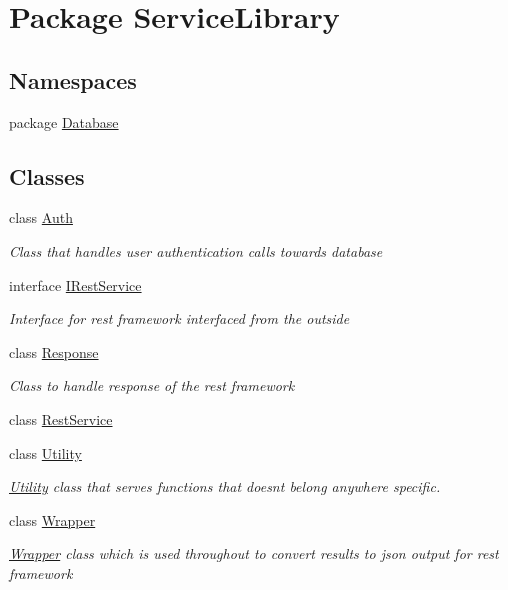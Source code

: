 \hypertarget{namespace_service_library}{\section{Package Service\-Library}
\label{namespace_service_library}
}
\subsection*{Namespaces}
\begin{DoxyCompactItemize}
\item 
package \hyperlink{namespace_service_library_1_1_database}{Database}
\end{DoxyCompactItemize}
\subsection*{Classes}
\begin{DoxyCompactItemize}
\item 
class \hyperlink{class_service_library_1_1_auth}{Auth}
\begin{DoxyCompactList}\small\item\em Class that handles user authentication calls towards database \end{DoxyCompactList}\item 
interface \hyperlink{interface_service_library_1_1_i_rest_service}{I\-Rest\-Service}
\begin{DoxyCompactList}\small\item\em Interface for rest framework interfaced from the outside \end{DoxyCompactList}\item 
class \hyperlink{class_service_library_1_1_response}{Response}
\begin{DoxyCompactList}\small\item\em Class to handle response of the rest framework \end{DoxyCompactList}\item 
class \hyperlink{class_service_library_1_1_rest_service}{Rest\-Service}
\item 
class \hyperlink{class_service_library_1_1_utility}{Utility}
\begin{DoxyCompactList}\small\item\em \hyperlink{class_service_library_1_1_utility}{Utility} class that serves functions that doesnt belong anywhere specific. \end{DoxyCompactList}\item 
class \hyperlink{class_service_library_1_1_wrapper}{Wrapper}
\begin{DoxyCompactList}\small\item\em \hyperlink{class_service_library_1_1_wrapper}{Wrapper} class which is used throughout to convert results to json output for rest framework \end{DoxyCompactList}\end{DoxyCompactItemize}
